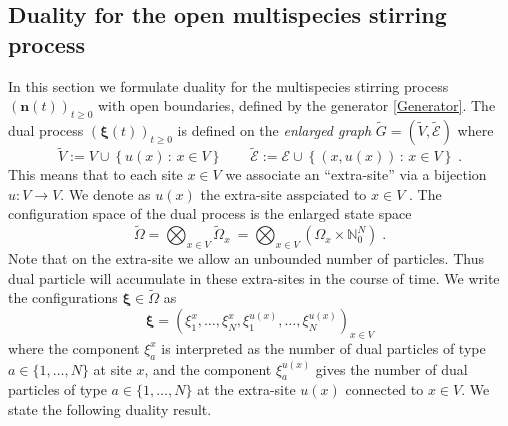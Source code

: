 \documentclass[10pt]{article}
\numberwithin{equation}{section}
\numberwithin{equation}{subsection}
\newcommand{\dt}{\;.}
\begin{document}
\subsection{Duality for the open multispecies stirring process}\label{statementDualitySubsection}
In this section we formulate duality for the multispecies stirring process $(\bm{n}(t))_{t\geq 0}$ with open boundaries, defined by the generator \eqref{Generator}.
The dual  process $(\bm{\xi}(t))_{t\geq 0}$ is defined on the \textit{enlarged graph} $\widetilde{G}=(\widetilde{V},\widetilde{\mathcal{E}})$ where 
\begin{equation}
	\widetilde{V}:=V\cup \left\{u(x)\,:\, x\in V\right\}\qquad \widetilde{\mathcal{E}}:=\mathcal{E}\cup \left\{(x,u(x))\,:\, x\in V\right\}\dt
\end{equation}
This means that to each site $x\in V$ we associate an ``extra-site'' via a bijection $u:V\to V$. We denote as $u(x)$ the extra-site asspciated to $x\in V$ . The configuration space of the dual process is the enlarged state space
\begin{equation}\label{dualStateSpace}
    \widetilde{\Omega}= \bigotimes_{x\in V} \widetilde{\Omega}_{x}\ = \bigotimes_{x\in V} (\Omega_{x}\times \mathbb{N}_{0}^{N})\dt
\end{equation}
Note that on the extra-site we allow an unbounded number of particles. Thus
dual particle will accumulate in these extra-sites in the course of time. 
We write the configurations $\bm{\xi} \in \widetilde\Omega$  as
\begin{equation}
    \bm{\xi}=\left(\xi_{1}^{x},\ldots,\xi_{N}^{x},\xi_{1}^{u(x)},\ldots,\xi_{N}^{u(x)}\right)_{x\in V}
\end{equation}
where the component $\xi_{a}^{x}$ is interpreted as the number of dual particles of type $a\in \{1,\ldots,N\}$ at site $x$, 
and the component $\xi_{a}^{u(x)}$  gives the number of dual particles of type $a\in \{1,\ldots,N\}$ at 
the extra-site $u(x)$ connected to $x\in V$. We state the following duality result.
\end{document}
